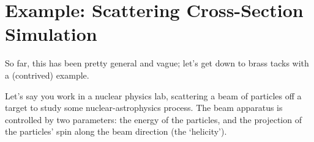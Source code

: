 \documentclass{article}
\begin{document}
% 
% 
% 

\section*{Example: Scattering Cross-Section Simulation}
	So far, this has been pretty general and vague; let's get down
	to brass tacks with a (contrived) example. 

	Let's say you work in a nuclear physics lab, scattering a beam
	of particles off a target to study some nuclear-astrophysics process.
	The beam apparatus is controlled by two parameters: the energy of
	the particles, and the projection of the particles' spin along
	the beam direction (the `helicity'). 
\end{document}
